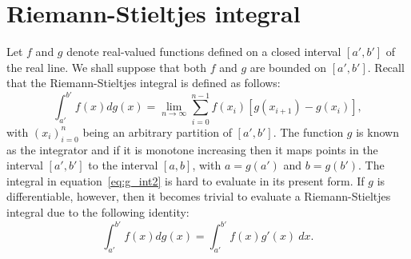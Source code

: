 \documentclass[twoside,reqno,11pt]{fcaa-var} %
\begin{document}
\section{Riemann-Stieltjes integral}
\label{sec:rs}
\noindent
Let $f$ and $g$ denote real-valued functions defined on a closed interval $[a',b']$ of the real line. We shall suppose that both $f$ and $g$ are bounded on $[a',b']$. Recall that the Riemann-Stieltjes integral is defined as follows:
\begin{equation}
\label{eq:g_int2}
\int_{a'}^{b'} f(x) dg(x) =  \lim_{n \rightarrow \infty}\sum_{i=0}^{n-1} f(x_i)[g(x_{i+1})-g(x_{i})], 
\end{equation}
with $(x_i)_{i=0}^n$ being an arbitrary partition of $[a',b']$. The function $g$ is known as the integrator and if it is monotone increasing then it maps points in the interval $[a',b']$ to the interval $[a,b]$, with $a = g(a')$ and $b = g(b')$. The integral in equation~\eqref{eq:g_int2} is hard to evaluate in its present form. If $g$ is differentiable, however, then it becomes trivial to 
evaluate a Riemann-Stieltjes integral due to the following identity:
\begin{equation}
\label{eq:rs_identity}
\int_{a'}^{b'} f(x) dg(x) = \int_{a'}^{b'} f(x)g'(x)~dx.
\end{equation}
\end{document}

